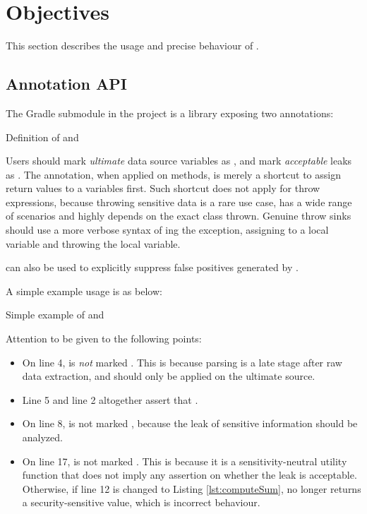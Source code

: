 \section{Objectives}
This section describes the usage and precise behaviour of \pname{}.

\subsection{Annotation API}
The  Gradle submodule in the project
is a  library exposing two annotations:

{Definition of  and }

Users should mark \emph{ultimate} data source variables as ,
and mark \emph{acceptable} leaks as .
The  annotation, when applied on methods,
is merely a shortcut to assign return values to a  variables first.
Such shortcut does not apply for throw expressions,
because throwing sensitive data is a rare use case,
has a wide range of scenarios
and highly depends on the exact class thrown.
Genuine throw sinks should use a more verbose syntax of ing the exception,
assigning to a local  variable and throwing the local variable.

 can also be used to explicitly suppress false positives generated by \pname{}.

A simple example usage is as below:

{Simple example of  and }

Attention to be given to the following points:
\begin{itemize}
	\item On line 4,  is \emph{not} marked .
		This is because parsing is a late stage after raw data extraction,
		and  should only be applied on the ultimate source.
	\item Line 5 and line 2 altogether assert that
		.
	\item On line 8,  is not marked ,
		because the leak of sensitive information should be analyzed.
	\item On line 17,  is not marked .
		This is because it is a sensitivity-neutral utility function
		that does not imply any assertion on whether the leak is acceptable.
		Otherwise, if line 12 is changed to Listing \ref{lst:computeSum},
		 no longer returns a security-sensitive value,
		which is incorrect behaviour.
\end{itemize}


